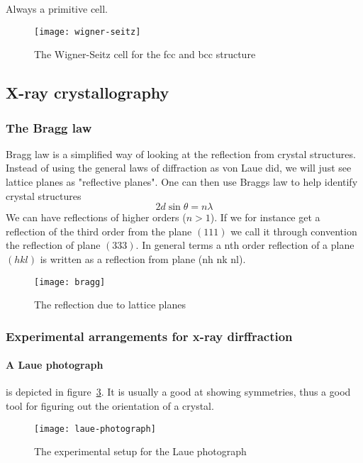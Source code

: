 \documentclass[11pt]{article}
\begin{document}
Always a primitive cell.
\begin{figure}[H]
	\centering
	\texttt{[image: wigner-seitz]}
	\caption{The Wigner-Seitz cell for the fcc and bcc structure}
	\label{fig:wigner-seitz}
\end{figure}

\newpage
\subsection{X-ray crystallography}
\subsubsection{The Bragg  law}
Bragg law is a simplified way of looking at the reflection from crystal structures. Instead of using the general laws of diffraction as von Laue did, we will just see lattice planes as "reflective planes". One can then use Braggs law to help identify crystal structures
\begin{equation}
	2d\sin{\theta} = n\lambda
\end{equation}
We can have reflections of higher orders ($n>1$). If we for instance get a reflection of the third order from the plane $(111)$ we call it through convention the reflection of plane $(333)$. In general terms a nth order reflection of a plane $(hkl)$ is written as a reflection from plane (nh nk nl).

\begin{figure}[H]
	\centering
	\texttt{[image: bragg]}
	\caption{The reflection due to lattice planes}
	\label{fig:bragg-law}
\end{figure}

\subsubsection{Experimental arrangements for x-ray dirffraction}
\newpage
\paragraph{A Laue photograph} is depicted in figure~\ref{fig:laue-photograph}. It is usually a good at showing symmetries, thus a good tool for figuring out the orientation of a crystal.
\begin{figure}[!h]
	\centering
	\texttt{[image: laue-photograph]}
	\caption{The experimental setup for the Laue photograph}
	\label{fig:laue-photograph}
\end{figure}
\end{document}
